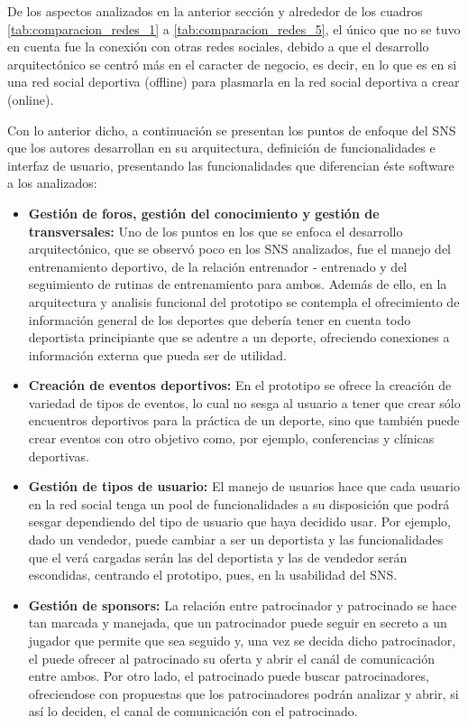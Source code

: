De los aspectos analizados en la anterior sección y alrededor de los cuadros \ref{tab:comparacion_redes_1} a \ref{tab:comparacion_redes_5}, el único que no se tuvo en cuenta fue la conexión con otras redes sociales, debido a que el desarrollo arquitectónico se centró más en el caracter de negocio, es decir, en lo que es en si una red social deportiva (offline) para plasmarla en la red social deportiva a crear (online).

Con lo anterior dicho, a continuación se presentan los puntos de enfoque del SNS que los autores desarrollan en su arquitectura, definición de funcionalidades e interfaz de usuario, presentando las funcionalidades que diferencian éste software a los analizados:

\begin{itemize}
	\item \textbf{Gestión de foros, gestión del conocimiento y gestión de transversales:} Uno de los puntos en los que se enfoca el desarrollo arquitectónico, que se observó poco en los SNS analizados, fue el manejo del entrenamiento deportivo, de la relación entrenador - entrenado y del seguimiento de rutinas de entrenamiento para ambos. Además de ello, en la arquitectura y analisis funcional del prototipo se contempla el ofrecimiento de información general de los deportes que debería tener en cuenta todo deportista principiante que se adentre a un deporte, ofreciendo conexiones a información externa que pueda ser de utilidad.
	\item \textbf{Creación de eventos deportivos:} En el prototipo se ofrece la creación de variedad de tipos de eventos, lo cual no sesga al usuario a tener que crear sólo encuentros deportivos para la práctica de un deporte, sino que también puede crear eventos con otro objetivo como, por ejemplo, conferencias y clínicas deportivas.
	\item \textbf{Gestión de tipos de usuario:} El manejo de usuarios hace que cada usuario en la red social tenga un pool de funcionalidades a su disposición que podrá sesgar dependiendo del tipo de usuario que haya decidido usar. Por ejemplo, dado un vendedor, puede cambiar a ser un deportista y las funcionalidades que el verá cargadas serán las del deportista y las de vendedor serán escondidas, centrando el prototipo, pues, en la usabilidad del SNS.
	\item \textbf{Gestión de sponsors:} La relación entre patrocinador y patrocinado se hace tan marcada y manejada, que un patrocinador puede seguir en secreto a un jugador que permite que sea seguido y, una vez se decida dicho patrocinador, el puede ofrecer al patrocinado su oferta y abrir el canál de comunicación entre ambos. Por otro lado, el patrocinado puede buscar patrocinadores, ofreciendose con propuestas que los patrocinadores podrán analizar y abrir, si así lo deciden, el canal de comunicación con el patrocinado.

\end{itemize}
